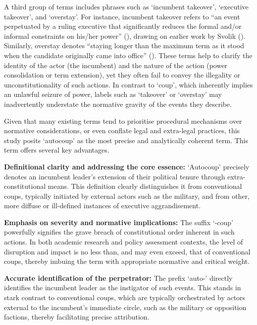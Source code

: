 \documentclass[
  12pt,
]{report}
\begin{document}
A third group of terms includes phrases such as `incumbent takeover',
`executive takeover', and `overstay'. For instance, incumbent takeover
refers to ``an event perpetuated by a ruling executive that
significantly reduces the formal and/or informal constraints on his/her
power'' (),
drawing on earlier work by Svolik ().
Similarly, overstay denotes ``staying longer than the maximum term as it
stood when the candidate originally came into office''
(). These terms help to clarify the identity of the actor (the
incumbent) and the nature of the action (power consolidation or term
extension), yet they often fail to convey the illegality or
unconstitutionality of such actions. In contrast to `coup', which
inherently implies an unlawful seizure of power, labels such as
`takeover' or `overstay' may inadvertently understate the normative
gravity of the events they describe.

Given that many existing terms tend to prioritise procedural mechanisms
over normative considerations, or even conflate legal and extra-legal
practices, this study posits `autocoup' as the most precise and
analytically coherent term. This term offers several key advantages.

\textbf{Definitional clarity and addressing the core essence:}
`Autocoup' precisely denotes an incumbent leader's extension of their
political tenure through extra-constitutional means. This definition
clearly distinguishes it from conventional coups, typically initiated by
external actors such as the military, and from other, more diffuse or
ill-defined instances of executive aggrandisement.

\textbf{Emphasis on severity and normative implications:} The suffix
`-coup' powerfully signifies the grave breach of constitutional order
inherent in such actions. In both academic research and policy
assessment contexts, the level of disruption and impact is no less than,
and may even exceed, that of conventional coups, thereby imbuing the
term with appropriate normative and critical weight.

\textbf{Accurate identification of the perpetrator:} The prefix `auto-'
directly identifies the incumbent leader as the instigator of such
events. This stands in stark contrast to conventional coups, which are
typically orchestrated by actors external to the incumbent's immediate
circle, such as the military or opposition factions, thereby
facilitating precise attribution.
\end{document}
